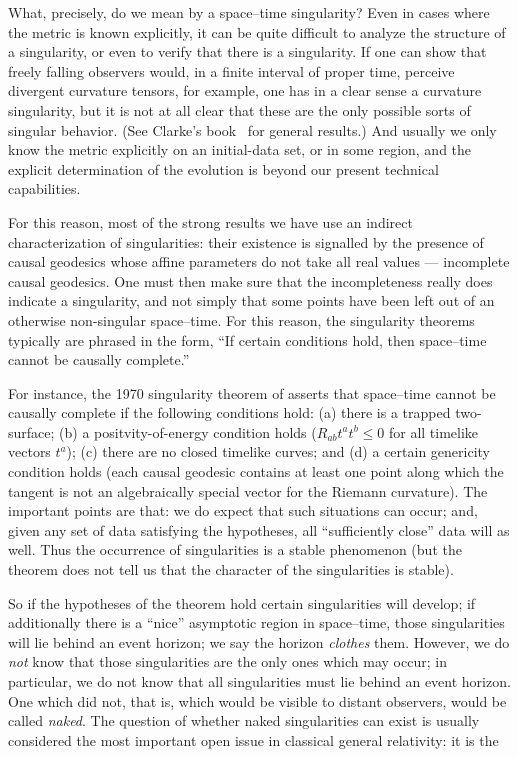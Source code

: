 \documentclass[
%
draft    %
,numberedheadings 
,bibliocites
  ]
  {aipproc}
\begin{document}
What, precisely, do we mean by a space--time singularity?
Even in cases where the metric is known explicitly, it can be quite difficult to analyze the structure of a singularity, or even to verify that there is a singularity.  If one can show that freely falling observers would, in a finite interval of proper time, perceive divergent curvature tensors, for example, one has in a clear sense a curvature singularity, but it is not at all clear that these are the only possible sorts of singular behavior.  (See Clarke's book~\citep{Clarke:1993} for general results.)  And usually we only know the metric explicitly on an initial-data set, or in some region, and the explicit determination of the evolution is beyond our present technical capabilities.

For this reason, most of the strong results we have use an indirect characterization of singularities:  their existence is signalled by the presence of causal geodesics whose affine parameters do not take all real values --- incomplete causal geodesics.  One must then make sure that the incompleteness really does indicate a singularity, and not simply that some points have been left out of an otherwise non-singular space--time.  For this reason, the singularity theorems typically are phrased in the form, ``If certain conditions hold, then space--time cannot be causally complete.''

For instance, the 1970 singularity theorem of \citet{HP1970}  asserts that space--time cannot be causally complete if the following conditions hold:  (a) there is a trapped two-surface; (b) a positvity-of-energy condition holds
($R_{ab}t^at^b\leq 0$ for all timelike vectors $t^a$); (c) there are no closed timelike curves; and (d) a certain genericity condition holds (each causal geodesic contains at least one point along which the tangent is not an algebraically special vector for the Riemann curvature). 
The important points are that:  we do expect that such situations can occur; and, given any set of data satisfying  the hypotheses, all ``sufficiently close'' data will as well.  Thus the occurrence of singularities is a stable phenomenon (but the theorem does not tell us that the character of the singularities is stable).

So if the hypotheses of the theorem hold certain singularities will develop; if additionally there is a ``nice'' asymptotic region in space--time, those singularities will lie behind an event horizon; we say the horizon {\em clothes} them.  However, we do {\em not} know that those singularities are the only ones which may occur; in particular, we do not know that all singularities must lie behind an event horizon.  One which did not, that is, which would be visible to distant observers, would be called {\em naked}.  The question of whether naked singularities can exist is usually considered the most important open issue in classical general relativity:  it is the
\end{document}
